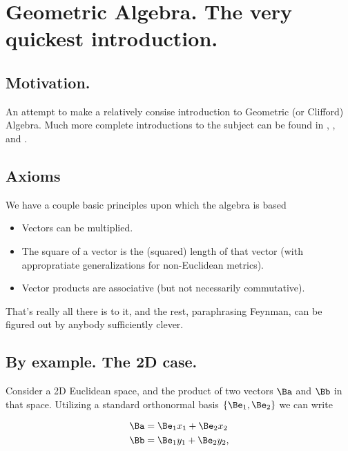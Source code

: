 
%

\chapter{Geometric Algebra.  The very quickest introduction.}
\label{chap:gaQuickIntro}
{}
\date{Mar 16, 2012}

\beginArtWithToc

\section{Motivation.}

An attempt to make a relatively consise introduction to Geometric (or Clifford) Algebra.  Much more complete introductions to the subject can be found in \cite{dorst2007gac}, \cite{doran2003gap}, and \cite{hestenes1999nfc}.

\section{Axioms}

We have a couple basic principles upon which the algebra is based

\begin{itemize}
\item Vectors can be multiplied.
\item The square of a vector is the (squared) length of that vector (with appropratiate generalizations for non-Euclidean metrics).
\item Vector products are associative (but not necessarily commutative).
\end{itemize}

That's really all there is to it, and the rest, paraphrasing Feynman, can be figured out by anybody sufficiently clever.

\section{By example.  The 2D case.}

Consider a 2D Euclidean space, and the product of two vectors $\Ba$ and $\Bb$ in that space.  Utilizing a standard orthonormal basis $\{\Be_1, \Be_2\}$ we can write

\begin{align}\label{eqn:gaQuickIntro:10}
\Ba &= \Be_1 x_1 + \Be_2 x_2 \\
\Bb &= \Be_1 y_1 + \Be_2 y_2,
\end{align}

